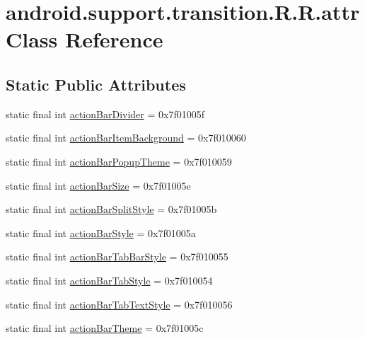 \hypertarget{classandroid_1_1support_1_1transition_1_1_r_1_1attr}{
\section{android.support.transition.R.R.attr Class Reference}
\label{classandroid_1_1support_1_1transition_1_1_r_1_1attr}
}
\subsection*{Static Public Attributes}
\begin{CompactItemize}
\item 
static final int \hyperlink{classandroid_1_1support_1_1transition_1_1_r_1_1attr_6b9539f9e7c90c73ecb1db49a2acb3ff}{actionBarDivider} = 0x7f01005f
\item 
static final int \hyperlink{classandroid_1_1support_1_1transition_1_1_r_1_1attr_9a0ca250c5fb10d3381bf77a0011c5f4}{actionBarItemBackground} = 0x7f010060
\item 
static final int \hyperlink{classandroid_1_1support_1_1transition_1_1_r_1_1attr_fbbf1b57d1e32c6c25ec3c1b5ece1403}{actionBarPopupTheme} = 0x7f010059
\item 
static final int \hyperlink{classandroid_1_1support_1_1transition_1_1_r_1_1attr_d44b3ff14ffce19dfdedcd2a9cd8a03f}{actionBarSize} = 0x7f01005e
\item 
static final int \hyperlink{classandroid_1_1support_1_1transition_1_1_r_1_1attr_080d1b67ea7df4af84c1616bf71a0982}{actionBarSplitStyle} = 0x7f01005b
\item 
static final int \hyperlink{classandroid_1_1support_1_1transition_1_1_r_1_1attr_94579d80fc244ed753acd43c07af920e}{actionBarStyle} = 0x7f01005a
\item 
static final int \hyperlink{classandroid_1_1support_1_1transition_1_1_r_1_1attr_6341d6c682dd48d3ac25faf8b4751851}{actionBarTabBarStyle} = 0x7f010055
\item 
static final int \hyperlink{classandroid_1_1support_1_1transition_1_1_r_1_1attr_d6b683522d86dcb50798112fe4e71350}{actionBarTabStyle} = 0x7f010054
\item 
static final int \hyperlink{classandroid_1_1support_1_1transition_1_1_r_1_1attr_276308635621dcd33865bc1163e29d6d}{actionBarTabTextStyle} = 0x7f010056
\item 
static final int \hyperlink{classandroid_1_1support_1_1transition_1_1_r_1_1attr_c8785381bb3ceebbe6e69636bcb6d58b}{actionBarTheme} = 0x7f01005c

\end{CompactItemize}

